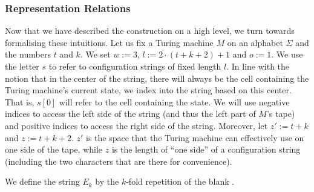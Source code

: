 \documentclass[a4paper,UKenglish,cleveref, autoref]{lipics-v2019}
\begin{document}
\subsubsection{Representation Relations}
Now that we have described the construction on a high level, we turn towards formalising these intuitions. 
Let us fix a Turing machine $M$ on an alphabet $\Sigma$  and the numbers $t$ and $k$. We set $w := 3$, $l := 2\cdot (t + k + 2) + 1$ and $o := 1$. 
We use the letter $s$ to refer to configuration strings of fixed length $l$. 
In line with the notion that in the center of the string, there will always be the cell containing the Turing machine's current state, we index into the string based on this center. 
That is, $s[0]$ will refer to the cell containing the state. 
We will use negative indices to access the left side of the string (and thus the left part of $M$'s tape) and positive indices to access the right side of the string.
Moreover, let $z' := t + k$ and $z := t + k + 2$. $z'$ is the space that the Turing machine can effectively use on one side of the tape, while $z$ is the length of ``one side'' of a configuration string (including the two characters that are there for convenience). 
 
\begin{center}
\end{center}

\newcommand{\reprt}[1]{\ensuremath{\sim_t^{#1}}}
\newcommand{\reprc}{\ensuremath{\sim_c}}

We define the string $E_k$ by the $k$-fold repetition of the blank \blank.
\end{document}
